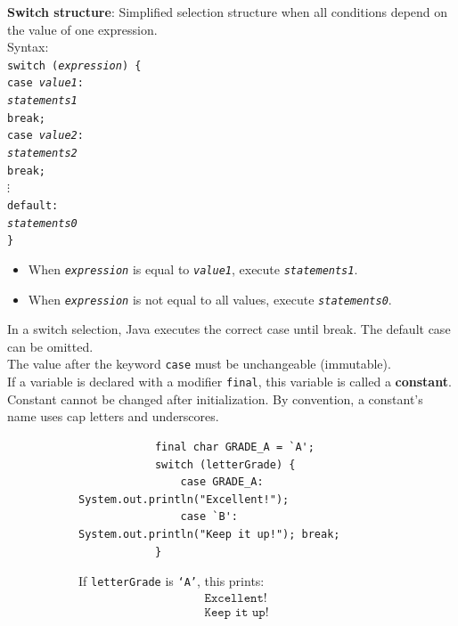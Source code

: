 \documentclass{article}
\begin{document}
\textbf{Switch structure}: Simplified selection structure when all conditions depend on the value of one expression.\\
Syntax:\\
\texttt{switch (\textit{expression}) \{\\
\hspace*{2em}case \textit{value1}:\\
\hspace*{4em}\textit{statements1}\\
\hspace*{4em}break;\\
\hspace*{2em}case \textit{value2}:\\
\hspace*{4em}\textit{statements2}\\
\hspace*{4em}break;\\
\hspace*{2em}$\vdots$\\
\hspace*{2em}default:\\
\hspace*{4em}\textit{statements0}\\
\}}
\begin{itemize}
	\item When \texttt{\textit{expression}} is equal to \texttt{\textit{value1}}, execute \texttt{\textit{statements1}}.
	\item When \texttt{\textit{expression}} is not equal to all values, execute \texttt{\textit{statements0}}.
\end{itemize}
In a switch selection, Java executes the correct case until break. The default case can be omitted.\\
The value after the keyword \texttt{case} must be unchangeable (immutable).\\
If a variable is declared with a modifier \texttt{final}, this variable is called a \textbf{constant}.\\
Constant cannot be changed after initialization. By convention, a constant's name uses cap letters and underscores.

\begin{figure}[h]
	\centering
	\begin{subfigure}[h]{.6\textwidth}
		\centering
		\begin{verbatim}
			final char GRADE_A = `A';
			switch (letterGrade) {
				case GRADE_A: System.out.println("Excellent!");
				case `B': System.out.println("Keep it up!"); break;
			}
		\end{verbatim}
	\end{subfigure}
	\begin{subfigure}[h]{.3\textwidth}
		If \texttt{letterGrade} is \texttt{`A'}, this prints:
		\begin{align*}
			&\texttt{Excellent!}\\
			&\texttt{Keep it up!}
		\end{align*}
	\end{subfigure}
\end{figure}
\end{document}
